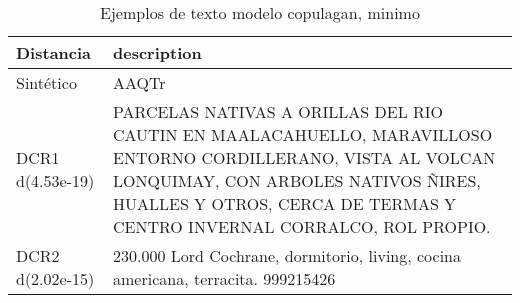 \begin{table}[H]
\centering
\fontsize{10}{14}\selectfont
\caption{Ejemplos de texto modelo copulagan, minimo}
\label{table-example-economicos-b-2-copulagan-min-text}
\begin{tabular}{|l|m{35em}|}
\hline
\rowcolor[gray]{0.8}
Distancia & description \\
\hline Sintético & AAQTr \\
\hline DCR1 d(4.53e-19) & PARCELAS NATIVAS A ORILLAS DEL RIO CAUTIN EN MAALACAHUELLO, MARAVILLOSO ENTORNO CORDILLERANO, VISTA AL VOLCAN LONQUIMAY, CON ARBOLES NATIVOS \~NIRES, HUALLES Y OTROS, CERCA DE TERMAS Y CENTRO INVERNAL CORRALCO, ROL PROPIO. \\
\hline DCR2 d(2.02e-15) & 230.000 Lord Cochrane, dormitorio, living, cocina americana, terracita. 999215426 \\
\hline
\end{tabular}
\end{table}

